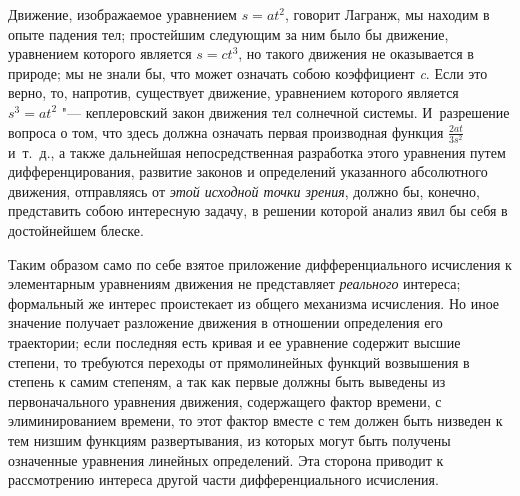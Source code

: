 Движение, изображаемое уравнением $s=at^2$, говорит Лагранж, мы находим в
опыте падения тел; простейшим следующим за ним было бы движение, уравнением
которого является $s=ct^3$, но такого движения не оказывается в природе;
мы не знали бы, что может означать собою коэффициент
{\em c}. Если это верно, то, напротив, существует
движение, уравнением которого является $s^3=at^2$ "--- кеплеровский закон
движения тел солнечной системы. И~разрешение вопроса о том, что здесь
должна означать первая производная функция $\frac{2at}{3s^2}$
и~т.~д., а также дальнейшая непосредственная разработка этого уравнения
путем дифференцирования, развитие законов и определений указанного
абсолютного движения, отправляясь от {\em этой исходной
точки зрения}, должно бы, конечно, представить собою интересную задачу, в
решении которой анализ явил бы себя в достойнейшем блеске.

Таким образом само по себе взятое приложение дифференциального исчисления к
элементарным уравнениям движения не представляет
{\em реального} интереса; формальный же интерес
проистекает из общего механизма исчисления. Но иное значение получает
разложение движения в отношении определения его траектории; если последняя
есть кривая и ее уравнение содержит высшие степени, то требуются переходы
от прямолинейных функций возвышения в степень к самим степеням, а так как
первые должны быть выведены из первоначального уравнения движения,
содержащего фактор времени, с элиминированием времени, то этот фактор
вместе с тем должен быть низведен к тем низшим функциям развертывания, из
которых могут быть получены означенные уравнения линейных определений. Эта
сторона приводит к рассмотрению интереса другой части дифференциального
исчисления.

